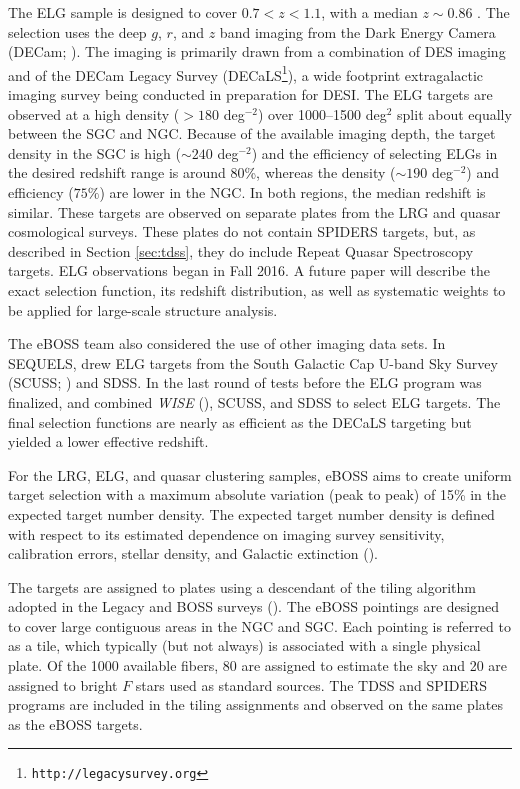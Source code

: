 The ELG sample is designed to cover $0.7<z<1.1$, with a median $z\sim
0.86$ \citep{comparat16a, jouvel16a}. The selection uses the deep $g$,
$r$, and $z$ band imaging from the Dark Energy Camera
(DECam; \citealt{flaugher12a}). The imaging is primarily drawn from a
combination of DES imaging and of the DECam Legacy Survey
(DECaLS\footnote{{\tt http://legacysurvey.org}}), a wide footprint
extragalactic imaging survey being conducted in preparation for DESI.
The ELG targets are observed at a high density ($>180$ deg$^{-2}$)
over 1000--1500 deg$^{2}$ split about equally between the SGC and
NGC. Because of the available imaging depth, the target density in the
SGC is high ($\sim 240$ deg$^{-2}$) and the efficiency of selecting
ELGs in the desired redshift range is around 80\%, whereas the density
($\sim 190$ deg$^{-2}$) and efficiency ($75\%$) are lower in the
NGC. In both regions, the median redshift is similar. These targets are
observed on separate plates from the LRG and quasar cosmological
surveys. These plates do not contain SPIDERS targets, but, as
described in Section \ref{sec:tdss}, they do include Repeat Quasar
Spectroscopy targets. ELG observations began in Fall 2016. A future
paper will describe the exact selection function, its redshift
distribution, as well as systematic weights to be applied for
large-scale structure analysis.

The eBOSS team also considered the use of other imaging data sets.  In
SEQUELS, \citet{comparat15a} drew ELG targets from the South Galactic
Cap U-band Sky Survey (SCUSS; \citealt{zou15a}) and SDSS. In the last
round of tests before the ELG program was
finalized, \citet{comparat16a} and \citet{raichoor16a} combined {\it WISE}
(\citealt{wright10a}), SCUSS, and SDSS to select ELG targets. The
final selection functions are nearly as efficient as the DECaLS
targeting but yielded a lower effective redshift.

For the LRG, ELG, and quasar clustering samples, eBOSS aims to create
uniform target selection with a maximum absolute variation (peak to
peak) of 15\% in the expected target number density. The expected
target number density is defined with respect to its estimated
dependence on imaging survey sensitivity, calibration errors, stellar
density, and Galactic extinction (\citealt{myers15a, prakash15a,
dawson16a}).

The targets are assigned to plates using a descendant of the tiling
algorithm adopted in the Legacy and BOSS surveys
(\citealt{blanton03a}). The eBOSS pointings are designed to cover
large contiguous areas in the NGC and SGC. Each pointing is referred
to as a tile, which typically (but not always) is associated with a
single physical plate.  Of the 1000 available fibers, 80 are assigned
to estimate the sky and 20 are assigned to bright $F$ stars used as
standard sources.  The TDSS and SPIDERS programs are included in the
tiling assignments and observed on the same plates as the eBOSS
targets.

